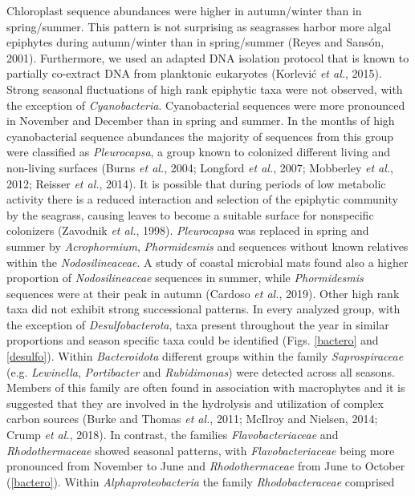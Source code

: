 \documentclass[12pt,]{article}
\begin{document}
Chloroplast sequence abundances were higher in autumn/winter than in
spring/summer. This pattern is not surprising as seagrasses harbor more
algal epiphytes during autumn/winter than in spring/summer (Reyes and
Sansón, 2001). Furthermore, we used an adapted DNA isolation protocol
that is known to partially co-extract DNA from planktonic eukaryotes
(Korlević \emph{et al.}, 2015). Strong seasonal fluctuations of high
rank epiphytic taxa were not observed, with the exception of
\emph{Cyanobacteria}. Cyanobacterial sequences were more pronounced in
November and December than in spring and summer. In the months of high
cyanobacterial sequence abundances the majority of sequences from this
group were classified as \emph{Pleurocapsa}, a group known to colonized
different living and non-living surfaces (Burns \emph{et al.}, 2004;
Longford \emph{et al.}, 2007; Mobberley \emph{et al.}, 2012; Reisser
\emph{et al.}, 2014). It is possible that during periods of low
metabolic activity there is a reduced interaction and selection of the
epiphytic community by the seagrass, causing leaves to become a suitable
surface for nonspecific colonizers (Zavodnik \emph{et al.}, 1998).
\emph{Pleurocapsa} was replaced in spring and summer by
\emph{Acrophormium}, \emph{Phormidesmis} and sequences without known
relatives within the \emph{Nodosilineaceae}. A study of coastal
microbial mats found also a higher proportion of \emph{Nodosilineaceae}
sequences in summer, while \emph{Phormidesmis} sequences were at their
peak in autumn (Cardoso \emph{et al.}, 2019). Other high rank taxa did
not exhibit strong successional patterns. In every analyzed group, with
the exception of \emph{Desulfobacterota}, taxa present throughout the
year in similar proportions and season specific taxa could be identified
(Figs. \ref{bactero} and \ref{desulfo}). Within \emph{Bacteroidota}
different groups within the family \emph{Saprospiraceae} (e.g.
\emph{Lewinella}, \emph{Portibacter} and \emph{Rubidimonas}) were
detected across all seasons. Members of this family are often found in
association with macrophytes and it is suggested that they are involved
in the hydrolysis and utilization of complex carbon sources (Burke and
Thomas \emph{et al.}, 2011; McIlroy and Nielsen, 2014; Crump \emph{et
al.}, 2018). In contrast, the families \emph{Flavobacteriaceae} and
\emph{Rhodothermaceae} showed seasonal patterns, with
\emph{Flavobacteriaceae} being more pronounced from November to June and
\emph{Rhodothermaceae} from June to October (\autoref{bactero}). Within
\emph{Alphaproteobacteria} the family \emph{Rhodobacteraceae} comprised
\end{document}
